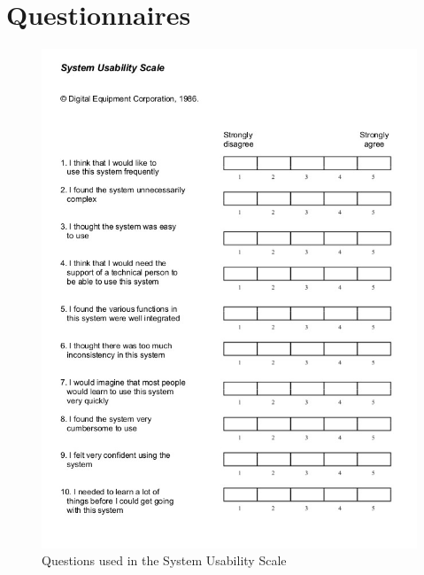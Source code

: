 \documentclass[a4paper,12pt]{kth-mag}
\begin{document}
\chapter{Questionnaires}\label{appA}
\begin{figure}[ht]
	\centering
	\includegraphics[keepaspectratio, scale = 0.8]{images/sus_quest.jpg}
	\caption{\small{Questions used in the System Usability Scale}}\label{Quest}
\end{figure}
\end{document}

